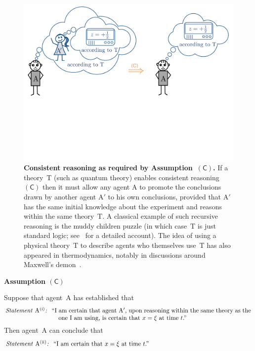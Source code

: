 \documentclass{article}
\theoremstyle{mystyle}
\theoremstyle{definition}
\newcommand*{\Agent}{\mathrm{A}}
\newcommand*{\Agentp}{\mathrm{A'}}
\newcommand*{\Theory}{\mathrm{T}}
\newcommand*{\SelfCons}{\mathsf{(C)}}
\newcommand*{\asn}[1]{``#1''}
\newcommand*{\sT}[1]{{\text{\emph{Statement} $#1$\emph{:} }}}
\newcommand*{\sTM}[1]{\begin{minipage}{14cm} \hangindent=8.6em  #1 \end{minipage}}
\begin{document}
  \begin{figure}
\centering
\includegraphics[trim= 0.4cm  11.2cm 0.4cm 0.4cm, clip=true, scale=0.2]{SelfRefR.pdf}
\caption{{\bf Consistent reasoning as required by Assumption~$\SelfCons$.} If a theory~$\Theory$ (such as quantum theory) enables consistent reasoning~$\SelfCons$ then it must allow any agent $\Agent$ to promote the conclusions drawn by another agent $\Agentp$ to his own conclusions, provided that $\Agentp$ has the same initial knowledge about the experiment and reasons within the same theory~$\Theory$. A classical example of  such recursive reasoning is the muddy children puzzle (in which case~$\Theory$ is just standard logic; see~\cite{FHMV04} for a detailed account).  The idea of using a physical theory~$\Theory$ to describe agents who themselves use~$\Theory$ has also appeared in thermodynamics, notably in discussions around Maxwell's demon~\cite{Bennett82}.
\label{fig_selfreference}} 
\end{figure} 

\begin{emphbox}
  \noindent \textbf{Assumption $\SelfCons$} 
  
   \smallskip 
  
\noindent Suppose that agent~$\Agent$ has established that
\nsb
\begin{align*}
\sTM{\sT{{\Agent}^{\mathrm{(i)}}}  \asn{I am certain  that agent~$\Agentp$, upon reasoning within the same theory as the one I am using, is certain that $x=\xi$ at time $t$.} }
\end{align*}
 Then agent~$\Agent$ can conclude that \nsb
 \begin{align*}
\sTM{\sT{{\Agent}^{\mathrm{(ii)}}}  \asn{I am certain that $x=\xi$ at time $t$.}}
\end{align*}
\vspace{-4ex}
\end{emphbox}
\end{document}
